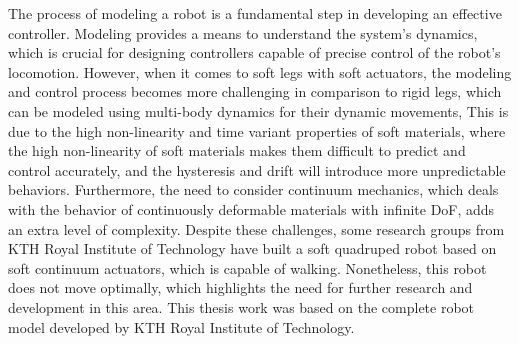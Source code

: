 The process of modeling a robot is a fundamental step in developing an effective controller\cite{gromovModelingControlRobotic2019}. Modeling provides a means to understand the system's dynamics, which is crucial for designing controllers capable of precise control of the robot's locomotion. However, when it comes to soft legs with soft actuators, the modeling and control process becomes more challenging in comparison to rigid legs, which can be modeled using multi-body dynamics for their dynamic movements, This is due to the high non-linearity\cite{slotineAppliedNonlinearControl1991} and time variant properties\cite{wangControlStrategiesSoft2022} of soft materials, where the high non-linearity of soft materials makes them difficult to predict and control accurately, and the hysteresis and drift will introduce more unpredictable behaviors. Furthermore, the need to consider continuum mechanics, which deals with the behavior of continuously deformable materials with infinite \ac{DoF}\cite{polygerinosSoftRoboticsReview2017}, adds an extra level of complexity. Despite these challenges, some research groups from KTH Royal Institute of Technology\cite{jiSynthesizingOptimalGait2022,daneliaStructureGaitOptimizationof2021,thorapallimuralidharanContinuumActuatorBased2020,jiLearningbasedControl4D} have built a soft quadruped robot based on soft continuum actuators, which is capable of walking. Nonetheless, this robot does not move optimally, which highlights the need for further research and development in this area. This thesis work was based on the complete robot model developed by KTH Royal Institute of Technology.

